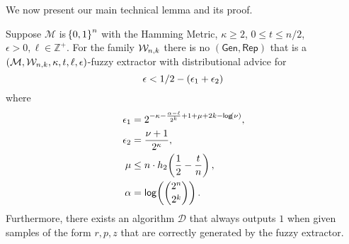 \noindent
We now present our main technical lemma and its proof. 
\begin{lemma}
\label{lem:convert distinguisher}
    Suppose $\mathcal{M}$ is $\!\left\{ 0,1 \right\}^{n}$ with the Hamming Metric, $\kappa \geq 2$, $0 \leq t \leq n/2$, $\epsilon > 0, \ell\in\mathbb{Z}^+$. 
For the family $\mathcal{W}_{n,k}$ there is no $(\mathsf{Gen, Rep})$ that is a $(\mathcal{M},\mathcal{W}_{n,k},\kappa, t, \ell, \epsilon)$-fuzzy extractor with distributional advice for
\[
\epsilon<1/2-\left(\epsilon_1+\epsilon_2\right)\\
\]
where 
\begin{align*}
\epsilon_1&= 2^{-\kappa-\frac{\alpha-\ell}{2^k}+1+\mu+2k-\mathsf{log}\!\left(\nu\right)},\\
\epsilon_2&=\frac{\nu+1}{2^{\kappa}},\\
  \mu &\leq n \cdot h_2\!\left(\frac{1}{2} - \frac{t}{n}\right),\\
\alpha &= \mathsf{log}\!\left({2^n\choose 2^k}\right).
\end{align*}
Furthermore, there exists an algorithm $\mathcal{D}$ that always outputs $1$ when given samples of the form $r, p, z$ that are correctly generated by the fuzzy extractor.
\end{lemma}

